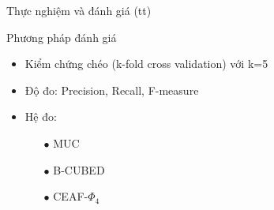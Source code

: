 \documentclass[9pt,xcolor=table,hyperref=unicode]{beamer}
\newcommand{\inlineitem}{%
\leavevmode\usebeamertemplate{itemize item}
}
\begin{document}
		\begin{frame}{Thực nghiệm và đánh giá (tt)}			
			\begin{block}{Phương pháp đánh giá}				
				\begin{itemize}
					\item{Kiểm chứng chéo (k-fold cross validation) với k=5}
					\item{Độ đo: Precision, Recall, F-measure}
					\item{Hệ đo: 
						\begin{itemize}
							\item[$\bullet$]{MUC}
							\item[$\bullet$]{B-CUBED}
							\item[$\bullet$]{CEAF-$\Phi_4$}
						\end{itemize}
					}					
				\end{itemize}		
			\end{block}
		\end{frame}

\end{document}
